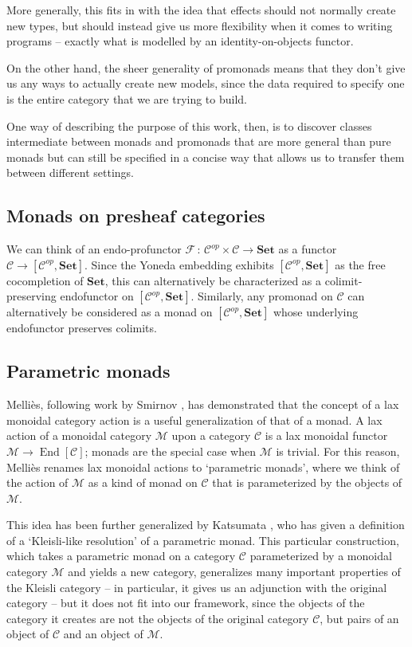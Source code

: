 \documentclass{svproc}
\newcommand\C{\mathcal{C}}
\newcommand\F{\mathcal{F}}
\newcommand\M{\mathcal{M}}
\newcommand\from{\,\colon\,}
\DeclareMathOperator{\End}{End}
\newcommand\Mellies{Melli\`{e}s\xspace}
\newcommand{\catname}[1]{\mathbf{#1}}
\newcommand{\Set}{\catname{Set}}
\begin{document}
More generally, this fits in with the idea that effects should not normally create new types, but should instead give us more flexibility when it comes to writing programs -- exactly what is modelled by an identity-on-objects functor.

On the other hand, the sheer generality of promonads means that they don't give us any ways to actually create new models, since the data required to specify one is the entire category that we are trying to build.

One way of describing the purpose of this work, then, is to discover classes intermediate between monads and promonads that are more general than pure monads but can still be specified in a concise way that allows us to transfer them between different settings.

\subsection{Monads on presheaf categories}

We can think of an endo-profunctor $\F\from \C^{op}\times\C\to \Set$ as a functor $\C\to [\C^{op},\Set]$.  
Since the Yoneda embedding exhibits $[\C^{op},\Set]$ as the free cocompletion of $\Set$, this can alternatively be characterized as a colimit-preserving endofunctor on $[\C^{op},\Set]$.  
Similarly, any promonad on $\C$ can alternatively be considered as a monad on $[\C^{op},\Set]$ whose underlying endofunctor preserves colimits.

\subsection{Parametric monads}

\Mellies \cite{ParametricMonads}, following work by Smirnov \cite{Smirnov2008}, has demonstrated that the concept of a lax monoidal category action is a useful generalization of that of a monad.  
A lax action of a monoidal category $\M$ upon a category $\C$ is a lax monoidal functor $\M\to \End[\C]$; monads are the special case when $\M$ is trivial.  
For this reason, \Mellies renames lax monoidal actions to `parametric monads', where we think of the action of $\M$ as a kind of monad on $\C$ that is parameterized by the objects of $\M$.

This idea has been further generalized by Katsumata \cite{Katsu}, who has given a definition of a `Kleisli-like resolution' of a parametric monad.  
This particular construction, which takes a parametric monad on a category $\C$ parameterized by a monoidal category $\M$ and yields a new category, generalizes many important properties of the Kleisli category -- in particular, it gives us an adjunction with the original category -- but it does not fit into our framework, since the objects of the category it creates are not the objects of the original category $\C$, but pairs of an object of $\C$ and an object of $\M$.
\end{document}

